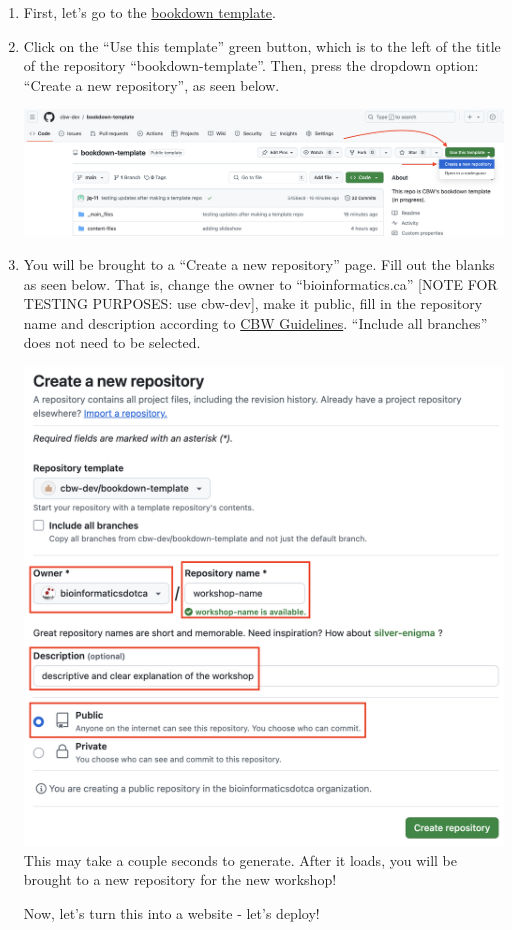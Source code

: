 \documentclass[
]{book}
\theoremstyle{definition}
\theoremstyle{definition}
\theoremstyle{definition}
\theoremstyle{definition}
\theoremstyle{remark}
\begin{document}
\begin{enumerate}
\def\labelenumi{\arabic{enumi}.}
\item
  First, let's go to the \href{https://github.com/cbw-dev/bookdown-template}{bookdown template}.
\item
  Click on the ``Use this template'' green button, which is to the left of the title of the repository ``bookdown-template''. Then, press the dropdown option: ``Create a new repository'', as seen below.

  \includegraphics{img/template/make-a-template.png}\\
\item
  You will be brought to a ``Create a new repository'' page. Fill out the blanks as seen below. That is, change the owner to ``bioinformatics.ca'' {[}NOTE FOR TESTING PURPOSES: use cbw-dev{]}, make it public, fill in the repository name and description according to \href{}{CBW Guidelines}. ``Include all branches'' does not need to be selected.

  \includegraphics{img/template/make-new-repo.png}\\

  This may take a couple seconds to generate. After it loads, you will be brought to a new repository for the new workshop!

  Now, let's turn this into a website - let's deploy!
\end{enumerate}
\end{document}
